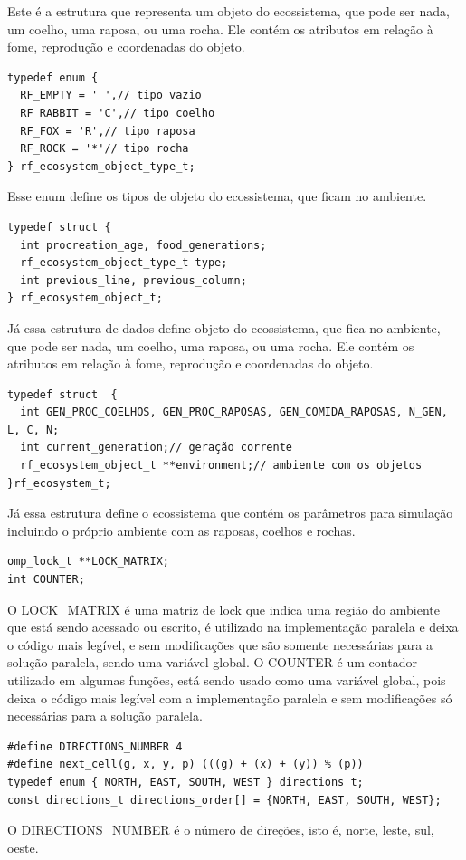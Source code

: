 \documentclass{article}
\begin{document}
Este é a estrutura que representa um objeto do ecossistema, que pode ser nada, um coelho, uma raposa, ou uma rocha. Ele contém os atributos em relação à fome, reprodução e coordenadas do objeto.

\begin{verbatim}
typedef enum {
  RF_EMPTY = ' ',// tipo vazio
  RF_RABBIT = 'C',// tipo coelho
  RF_FOX = 'R',// tipo raposa
  RF_ROCK = '*'// tipo rocha
} rf_ecosystem_object_type_t;
      \end{verbatim}

Esse enum define os tipos de objeto do ecossistema, que ficam no ambiente.

\begin{verbatim}
typedef struct {
  int procreation_age, food_generations;
  rf_ecosystem_object_type_t type;
  int previous_line, previous_column;
} rf_ecosystem_object_t;
      \end{verbatim}

Já essa estrutura de dados define objeto do ecossistema, que fica no ambiente, que pode ser nada, um coelho, uma raposa, ou uma rocha. Ele contém os atributos em relação à fome, reprodução e coordenadas do objeto.

\begin{verbatim}
typedef struct  {
  int GEN_PROC_COELHOS, GEN_PROC_RAPOSAS, GEN_COMIDA_RAPOSAS, N_GEN, L, C, N;
  int current_generation;// geração corrente
  rf_ecosystem_object_t **environment;// ambiente com os objetos
}rf_ecosystem_t;
      \end{verbatim}


Já essa estrutura define o ecossistema que contém os parâmetros para simulação incluindo o próprio ambiente com as raposas, coelhos e rochas.

\begin{verbatim}
omp_lock_t **LOCK_MATRIX;
int COUNTER;
      \end{verbatim}
O LOCK\_MATRIX é uma matriz de lock que indica uma região do ambiente que está sendo acessado ou escrito, é utilizado na implementação paralela e deixa o código mais legível, e sem modificações que são somente necessárias para a solução paralela, sendo uma variável global.
O COUNTER é um contador utilizado em algumas funções, está sendo usado como uma variável global, pois deixa o código mais legível com a implementação paralela e sem modificações só necessárias para a solução paralela.


\begin{verbatim}
#define DIRECTIONS_NUMBER 4
#define next_cell(g, x, y, p) (((g) + (x) + (y)) % (p))
typedef enum { NORTH, EAST, SOUTH, WEST } directions_t;
const directions_t directions_order[] = {NORTH, EAST, SOUTH, WEST};
      \end{verbatim}
O DIRECTIONS\_NUMBER é o número de direções, isto é, norte, leste, sul, oeste.
\end{document}
